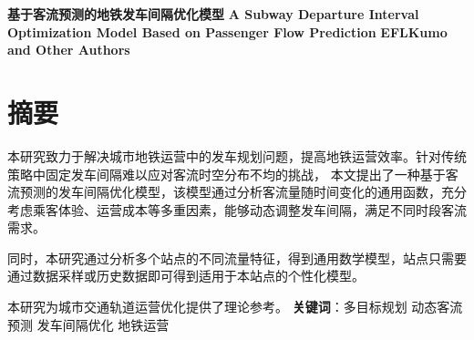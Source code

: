 \thispagestyle{empty}   %

\begin{center}
    \textbf{\fontsize{20}{1.5}基于客流预测的地铁发车间隔优化模型}
    \newline
    \textbf{\fontsize{12}{1.5}A Subway Departure Interval Optimization Model Based on Passenger Flow Prediction}
    \newline
    \textbf{\fontsize{12}{1.5}EFLKumo and Other Authors}

\end{center}





%
%


\section*{摘要}

本研究致力于解决城市地铁运营中的发车规划问题，提高地铁运营效率。针对传统策略中固定发车间隔难以应对客流时空分布不均的挑战，
本文提出了一种基于客流预测的发车间隔优化模型，该模型通过分析客流量随时间变化的通用函数，充分考虑乘客体验、运营成本等多重因素，能够动态调整发车间隔，满足不同时段客流需求。

同时，本研究通过分析多个站点的不同流量特征，得到通用数学模型，站点只需要通过数据采样或历史数据即可得到适用于本站点的个性化模型。

本研究为城市交通轨道运营优化提供了理论参考。\newline
\newline
\textbf{关键词}：多目标规划 \quad 动态客流预测 \quad 发车间隔优化 \quad 地铁运营